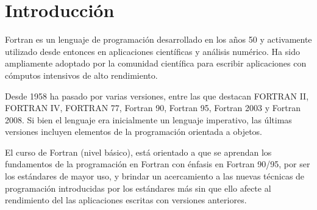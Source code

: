 \section{Introducción}


Fortran es un lenguaje de programación desarrollado en los años 50 y activamente utilizado desde entonces en aplicaciones científicas y análisis numérico. Ha sido ampliamente adoptado por la comunidad científica para escribir aplicaciones con cómputos intensivos de alto rendimiento.

Desde 1958 ha pasado por varias versiones, entre las que destacan FORTRAN II, FORTRAN IV, FORTRAN 77, Fortran 90, Fortran 95, Fortran 2003 y Fortran 2008. Si bien el lenguaje era inicialmente un lenguaje imperativo, las últimas versiones incluyen elementos de la programación orientada a objetos.

El curso de Fortran (nivel básico), está orientado a que se aprendan los fundamentos de la programación en Fortran con énfasis en Fortran 90/95, por ser los estándares de mayor uso, y brindar un acercamiento a las nuevas técnicas de programación introducidas por los estándares más sin que ello afecte al rendimiento del las aplicaciones escritas con versiones anteriores.
